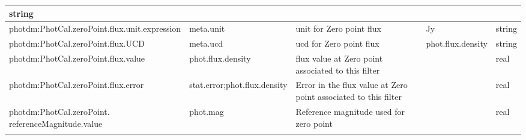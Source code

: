 \documentclass[11pt,a4paper]{ivoa}
\begin{document}
\begin{appendices}
\begin{table}[H]
\begin{adjustbox}{angle=90}
\begin{tabular}{p{2.5in}|p{1.5in}|p{2in}|p{0.74in}|p{0.35in}}
\multicolumn{1}{p{0.35in}}{{\fontsize{8pt}{8pt}\selectfont string}} \\
\hline
\multicolumn{1}{p{2.5in}}{{\fontsize{8pt}{8pt}
\selectfont photdm:PhotCal.zeroPoint.\-flux.unit.expression}} &
\multicolumn{1}{p{1.5in}}{{\fontsize{8pt}{8pt}\selectfont meta.unit }} &
\multicolumn{1}{p{2in}}{{\fontsize{8pt}{8pt}\selectfont unit for Zero point flux}} &
\multicolumn{1}{p{0.74in}}{{\fontsize{8pt}{8pt}\selectfont Jy}} &
\multicolumn{1}{p{0.35in}}{{\fontsize{8pt}{8pt}\selectfont string}} \\
\hline
\multicolumn{1}{p{2.5in}}{{\fontsize{8pt}{8pt}\selectfont photdm:PhotCal.zeroPoint.\-flux.UCD}} &
\multicolumn{1}{p{1.5in}}{{\fontsize{8pt}{8pt}\selectfont meta.ucd }} &
\multicolumn{1}{p{2in}}{{\fontsize{8pt}{8pt}\selectfont ucd for Zero point flux}} &
\multicolumn{1}{p{0.74in}}{{\fontsize{8pt}{8pt}\selectfont phot.flux.density}} &
\multicolumn{1}{p{0.35in}}{{\fontsize{8pt}{8pt}\selectfont string}} \\
\hline
\multicolumn{1}{p{2.5in}}{{\fontsize{8pt}{8pt}\selectfont photdm:PhotCal.zeroPoint.\-flux.value}} &
\multicolumn{1}{p{1.5in}}{{\fontsize{8pt}{8pt}\selectfont phot.flux.density }} &
\multicolumn{1}{p{2in}}{{\fontsize{8pt}{8pt}\selectfont flux value at Zero point associated 
to this filter}} &
\multicolumn{1}{p{0.74in}}{} &
\multicolumn{1}{p{0.35in}}{{\fontsize{8pt}{8pt}\selectfont real}} \\
\hline
\multicolumn{1}{p{2.5in}}{{\fontsize{8pt}{8pt}\selectfont photdm:PhotCal.zeroPoint.\-flux.error}} &
\multicolumn{1}{p{1.5in}}{{\fontsize{8pt}{8pt}\selectfont stat.error;phot.flux.density}} &
\multicolumn{1}{p{2in}}{{\fontsize{8pt}{8pt}\selectfont Error in the flux value at Zero point 
associated to this filter}} &
\multicolumn{1}{p{0.74in}}{} &
\multicolumn{1}{p{0.35in}}{{\fontsize{8pt}{8pt}\selectfont real}} \\
\hline
\multicolumn{1}{p{2.5in}}{{\fontsize{8pt}{8pt}
\selectfont photdm:PhotCal.zeroPoint.\newline referenceMagnitude.value}} &
\multicolumn{1}{p{1.5in}}{{\fontsize{8pt}{8pt}\selectfont phot.mag}} &
\multicolumn{1}{p{2in}}{{\fontsize{8pt}{8pt}\selectfont Reference magnitude used for zero point}} &
\multicolumn{1}{p{0.74in}}{{\fontsize{8pt}{8pt}\selectfont 0.0}} &
\multicolumn{1}{p{0.35in}}{{\fontsize{8pt}{8pt}\selectfont real} \par } \\
\hline
\multicolumn{1}{p{2.5in}}{{\fontsize{8pt}{8pt}
}}
\end{tabular}
\end{adjustbox}
\end{table}
\end{appendices}
\end{document}
